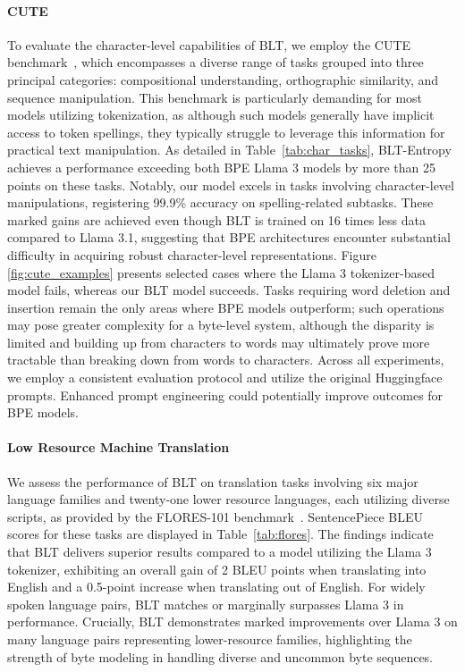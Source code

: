 \paragraph{CUTE}
To evaluate the character-level capabilities of {\textsc BLT}, we employ the CUTE benchmark~\citep{edman2024cute}, which encompasses a diverse range of tasks grouped into three principal categories: compositional understanding, orthographic similarity, and sequence manipulation. This benchmark is particularly demanding for most models utilizing tokenization, as although such models generally have implicit access to token spellings, they typically struggle to leverage this information for practical text manipulation. As detailed in Table~\ref{tab:char_tasks}, {\textsc BLT}-Entropy achieves a performance exceeding both BPE Llama 3 models by more than 25 points on these tasks. Notably, our model excels in tasks involving character-level manipulations, registering 99.9\% accuracy on spelling-related subtasks. These marked gains are achieved even though {\textsc BLT} is trained on 16 times less data compared to Llama 3.1, suggesting that BPE architectures encounter substantial difficulty in acquiring robust character-level representations. Figure \ref{fig:cute_examples} presents selected cases where the Llama 3 tokenizer-based model fails, whereas our {\textsc BLT} model succeeds. Tasks requiring word deletion and insertion remain the only areas where BPE models outperform; such operations may pose greater complexity for a byte-level system, although the disparity is limited and building up from characters to words may ultimately prove more tractable than breaking down from words to characters. Across all experiments, we employ a consistent evaluation protocol and utilize the original Huggingface prompts. Enhanced prompt engineering could potentially improve outcomes for BPE models.

\paragraph{Low Resource Machine Translation} We assess the performance of {\textsc BLT} on translation tasks involving six major language families and twenty-one lower resource languages, each utilizing diverse scripts, as provided by the FLORES-101 benchmark~\citep{goyal2022flores}. SentencePiece BLEU scores for these tasks are displayed in Table~\ref{tab:flores}. The findings indicate that {\textsc BLT} delivers superior results compared to a model utilizing the Llama 3 tokenizer, exhibiting an overall gain of 2 BLEU points when translating into English and a 0.5-point increase when translating out of English. For widely spoken language pairs, {\textsc BLT} matches or marginally surpasses Llama 3 in performance. Crucially, {\textsc BLT} demonstrates marked improvements over Llama 3 on many language pairs representing lower-resource families, highlighting the strength of byte modeling in handling diverse and uncommon byte sequences.

